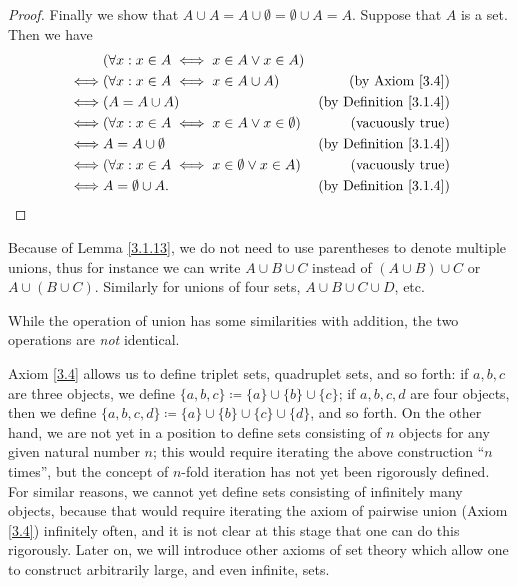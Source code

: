 \begin{proof}
    Finally we show that \(A \cup A = A \cup \emptyset = \emptyset \cup A = A\).
    Suppose that \(A\) is a set.
    Then we have
    \begin{align*}
             & (\forall x : x \in A \iff x \in A \lor x \in A)                                              \\
        \iff & (\forall x : x \in A \iff x \in A \cup A)               & \text{(by Axiom \ref{3.4})}        \\
        \iff & (A = A \cup A)                                          & \text{(by Definition \ref{3.1.4})} \\
        \iff & (\forall x : x \in A \iff x \in A \lor x \in \emptyset) & \text{(vacuously true)}            \\
        \iff & A = A \cup \emptyset                                    & \text{(by Definition \ref{3.1.4})} \\
        \iff & (\forall x : x \in A \iff x \in \emptyset \lor x \in A) & \text{(vacuously true)}            \\
        \iff & A = \emptyset \cup A.                                   & \text{(by Definition \ref{3.1.4})}
    \end{align*}
\end{proof}

\begin{note}
    Because of Lemma \ref{3.1.13}, we do not need to use parentheses to denote multiple unions, thus for instance we can write \(A \cup B \cup C\) instead of \((A \cup B) \cup C\) or \(A \cup (B \cup C)\).
    Similarly for unions of four sets, \(A \cup B \cup C \cup D\), etc.
\end{note}

\begin{remark}\label{3.1.14}
    While the operation of union has some similarities with addition, the two operations are \emph{not} identical.
\end{remark}

\begin{note}
    Axiom \ref{3.4} allows us to define triplet sets, quadruplet sets, and so forth: if \(a, b, c\) are three objects, we define \(\{a, b, c\} \coloneqq \{a\} \cup \{b\} \cup \{c\}\);
    if \(a, b, c, d\) are four objects, then we define \(\{a, b, c, d\} \coloneqq \{a\} \cup \{b\} \cup \{c\} \cup \{d\}\), and so forth.
    On the other hand, we are not yet in a position to define sets consisting of \(n\) objects for any given natural number \(n\);
    this would require iterating the above construction ``\(n\) times'', but the concept of \(n\)-fold iteration has not yet been rigorously defined.
    For similar reasons, we cannot yet define sets consisting of infinitely many objects, because that would require iterating the axiom of pairwise union (Axiom \ref{3.4}) infinitely often, and it is not clear at this stage that one can do this rigorously.
    Later on, we will introduce other axioms of set theory which allow one to construct arbitrarily large, and even infinite, sets.
\end{note}

